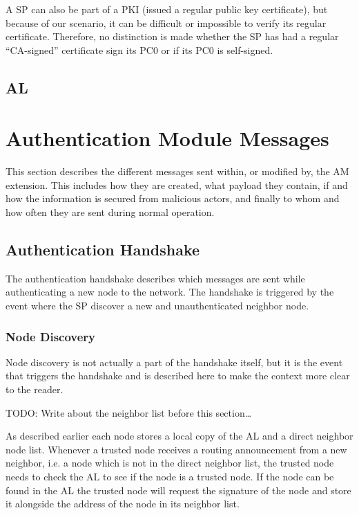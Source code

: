 A \ac{SP} can also be part of a \ac{PKI} (issued a regular public key
certificate), but because of our scenario, it can be difficult or impossible to
verify its regular certificate. Therefore, no distinction is made whether the
\ac{SP} has had a regular ``\ac{CA}-signed'' certificate sign its \ac{PC0} or if
its \ac{PC0} is self-signed.


\subsection{\acf{AL}}


\section{Authentication Module Messages}
\label{sect:am_messages}
This section describes the different messages sent within, or modified by, the
\ac{AM} extension. This includes how they are created, what payload they
contain, if and how the information is secured from malicious actors, and
finally to whom and how often they are sent during normal operation.

\subsection{Authentication Handshake}
The authentication handshake describes which messages are sent while
authenticating a new node to the network. The handshake is triggered by the
event where the \ac{SP} discover a new and unauthenticated neighbor node.

\subsubsection*{Node Discovery}
Node discovery is not actually a part of the handshake itself, but it is the
event that triggers the handshake and is described here to make the context more
clear to the reader.

TODO: Write about the neighbor list before this section\ldots

As described earlier each node stores a local copy of the \ac{AL} and a direct
neighbor node list. Whenever a trusted node receives a routing announcement from
a new neighbor, i.e. a node which is not in the direct neighbor list, the
trusted node needs to check the \ac{AL} to see if the node is a trusted node. If
the node can be found in the \ac{AL} the trusted node will request the signature
of the node and store it alongside the address of the node in its neighbor list.

